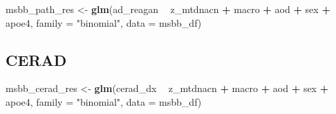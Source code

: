 \documentclass[]{book}
\newenvironment{Shaded}{\begin{snugshade}}{\end{snugshade}}
\newcommand{\DataTypeTok}[1]{\textcolor[rgb]{0.13,0.29,0.53}{#1}}
\newcommand{\FloatTok}[1]{\textcolor[rgb]{0.00,0.00,0.81}{#1}}
\newcommand{\KeywordTok}[1]{\textcolor[rgb]{0.13,0.29,0.53}{\textbf{#1}}}
\newcommand{\NormalTok}[1]{#1}
\newcommand{\OperatorTok}[1]{\textcolor[rgb]{0.81,0.36,0.00}{\textbf{#1}}}
\newcommand{\StringTok}[1]{\textcolor[rgb]{0.31,0.60,0.02}{#1}}
\begin{document}
\begin{Shaded}
\begin{Highlighting}[]
\NormalTok{msbb_path_res <-}\StringTok{ }\KeywordTok{glm}\NormalTok{(ad_reagan }\OperatorTok{~}\StringTok{ }\NormalTok{z_mtdnacn }\OperatorTok{+}\StringTok{ }\NormalTok{macro }\OperatorTok{+}\StringTok{ }\NormalTok{aod }\OperatorTok{+}\StringTok{ }\NormalTok{sex }\OperatorTok{+}\StringTok{ }\NormalTok{apoe4, }
                       \DataTypeTok{family =} \StringTok{"binomial"}\NormalTok{, }\DataTypeTok{data =}\NormalTok{ msbb_df)}
\end{Highlighting}
\end{Shaded}

\begin{Shaded}
\end{Shaded}

\hypertarget{cerad}{%
\subsection{CERAD}\label{cerad}}

\begin{Shaded}
\begin{Highlighting}[]
\NormalTok{msbb_cerad_res <-}\StringTok{ }\KeywordTok{glm}\NormalTok{(cerad_dx }\OperatorTok{~}\StringTok{ }\NormalTok{z_mtdnacn }\OperatorTok{+}\StringTok{ }\NormalTok{macro }\OperatorTok{+}\StringTok{ }\NormalTok{aod }\OperatorTok{+}\StringTok{ }\NormalTok{sex }\OperatorTok{+}\StringTok{ }\NormalTok{apoe4, }
                       \DataTypeTok{family =} \StringTok{"binomial"}\NormalTok{, }\DataTypeTok{data =}\NormalTok{ msbb_df)}
\end{Highlighting}
\end{Shaded}
\end{document}
